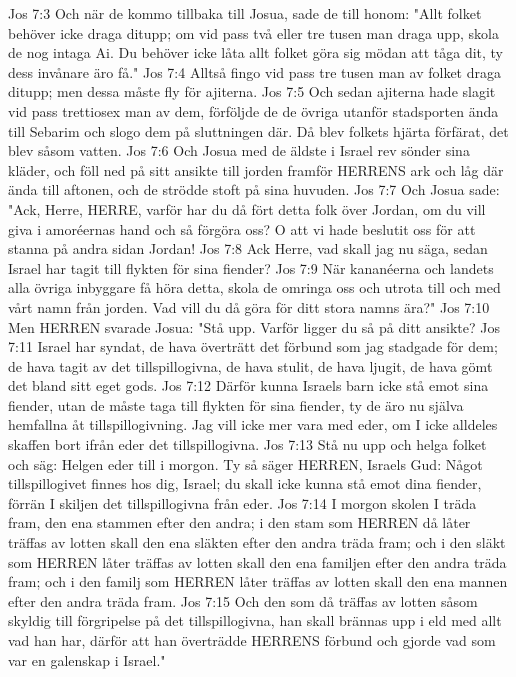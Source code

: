Jos 7:3  Och när de kommo tillbaka till Josua, sade de till honom: "Allt folket behöver icke draga ditupp; om vid pass två eller tre tusen man draga upp, skola de nog intaga Ai. Du behöver icke låta allt folket göra sig mödan att tåga dit, ty dess invånare äro få."
Jos 7:4  Alltså fingo vid pass tre tusen man av folket draga ditupp; men dessa måste fly för ajiterna.
Jos 7:5  Och sedan ajiterna hade slagit vid pass trettiosex man av dem, förföljde de de övriga utanför stadsporten ända till Sebarim och slogo dem på sluttningen där. Då blev folkets hjärta förfärat, det blev såsom vatten.
Jos 7:6  Och Josua med de äldste i Israel rev sönder sina kläder, och föll ned på sitt ansikte till jorden framför HERRENS ark och låg där ända till aftonen, och de strödde stoft på sina huvuden.
Jos 7:7  Och Josua sade: "Ack, Herre, HERRE, varför har du då fört detta folk över Jordan, om du vill giva i amoréernas hand och så förgöra oss? O att vi hade beslutit oss för att stanna på andra sidan Jordan!
Jos 7:8  Ack Herre, vad skall jag nu säga, sedan Israel har tagit till flykten för sina fiender?
Jos 7:9  När kananéerna och landets alla övriga inbyggare få höra detta, skola de omringa oss och utrota till och med vårt namn från jorden. Vad vill du då göra för ditt stora namns ära?"
Jos 7:10  Men HERREN svarade Josua: "Stå upp. Varför ligger du så på ditt ansikte?
Jos 7:11  Israel har syndat, de hava överträtt det förbund som jag stadgade för dem; de hava tagit av det tillspillogivna, de hava stulit, de hava ljugit, de hava gömt det bland sitt eget gods.
Jos 7:12  Därför kunna Israels barn icke stå emot sina fiender, utan de måste taga till flykten för sina fiender, ty de äro nu själva hemfallna åt tillspillogivning. Jag vill icke mer vara med eder, om I icke alldeles skaffen bort ifrån eder det tillspillogivna.
Jos 7:13  Stå nu upp och helga folket och säg: Helgen eder till i morgon. Ty så säger HERREN, Israels Gud: Något tillspillogivet finnes hos dig, Israel; du skall icke kunna stå emot dina fiender, förrän I skiljen det tillspillogivna från eder.
Jos 7:14  I morgon skolen I träda fram, den ena stammen efter den andra; i den stam som HERREN då låter träffas av lotten skall den ena släkten efter den andra träda fram; och i den släkt som HERREN låter träffas av lotten skall den ena familjen efter den andra träda fram; och i den familj som HERREN låter träffas av lotten skall den ena mannen efter den andra träda fram.
Jos 7:15  Och den som då träffas av lotten såsom skyldig till förgripelse på det tillspillogivna, han skall brännas upp i eld med allt vad han har, därför att han överträdde HERRENS förbund och gjorde vad som var en galenskap i Israel."
